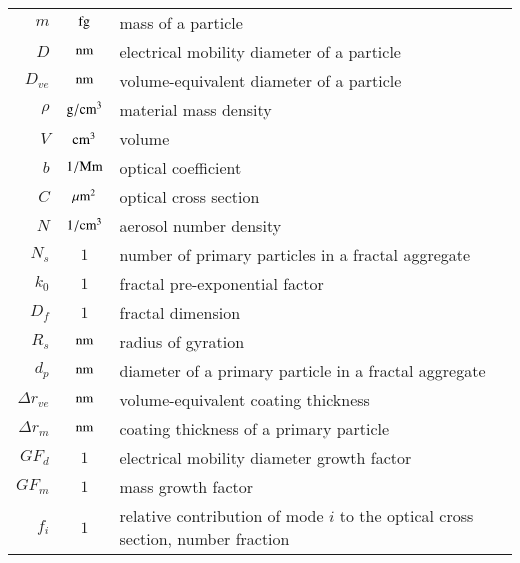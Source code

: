 \begin{tabular}{r c l}
    $m$ & $\rm fg$ & mass of a particle\\
    $D$ & $\rm nm$ & electrical mobility diameter of a particle\\
    $D_{ve}$ & $\rm nm$ & volume-equivalent diameter of a particle\\
    $\rho$ & $\rm g/cm^3$ & material mass density\\
    $V$ & $\rm cm^3$ & volume\\
    $b$ & $\rm 1/Mm$ & optical coefficient\\
    $C$ & $\rm \mu m^2$ & optical cross section\\
    $N$ & $\rm 1/cm^3$ & aerosol number density\\
    $N_s$ & $1$ & number of primary particles in a fractal aggregate\\
    $k_0$ & $1$ & fractal pre-exponential factor\\
    $D_f$ & $1$ & fractal dimension\\
    $R_s$ & $\rm nm$ & radius of gyration\\
    $d_p$ & $\rm nm$ & diameter of a primary particle in a fractal aggregate\\
    $\Delta r_{ve}$ & $\rm nm$ & volume-equivalent coating thickness\\
    $\Delta r_m$ & $\rm nm$& coating thickness of a primary particle\\
    $GF_{d}$ & $1$ & electrical mobility diameter growth factor\\
    $GF_{m}$ & $1$ & mass growth factor\\
    $f_i$ & $1$ & relative contribution of mode $i$ to the optical cross section, number fraction\\
\end{tabular}
